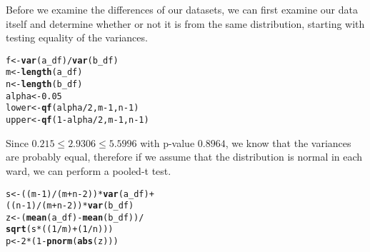 \documentclass[10pt]{article}\usepackage[]{graphicx}\usepackage[]{xcolor}
\makeatletter
\newcommand{\hlnum}[1]{\textcolor[rgb]{0.686,0.059,0.569}{#1} }%
\newcommand{\hlopt}[1]{\textcolor[rgb]{0,0,0}{#1} }%
\newcommand{\hlstd}[1]{\textcolor[rgb]{0.345,0.345,0.345}{#1} }%
\newcommand{\hlkwb}[1]{\textcolor[rgb]{0.69,0.353,0.396}{#1} }%
\newcommand{\hlkwd}[1]{\textcolor[rgb]{0.737,0.353,0.396}{\textbf{#1} } }%
\newenvironment{kframe}{%
 \def\at@end@of@kframe{}%
 \ifinner\ifhmode%
  \def\at@end@of@kframe{\end{minipage} }%
  \begin{minipage}{\columnwidth}%
 \fi\fi%
 \def\FrameCommand##1{\hskip\@totalleftmargin \hskip-\fboxsep
 \colorbox{shadecolor}{##1}\hskip-\fboxsep
     \hskip-\linewidth \hskip-\@totalleftmargin \hskip\columnwidth}%
 \MakeFramed {\advance\hsize-\width
   \@totalleftmargin\z@ \linewidth\hsize
   \@setminipage} }%
 {\par\unskip\endMakeFramed%
 \at@end@of@kframe}
\newenvironment{knitrout}{}{} %
\makeatother
\begin{document}
\begin{easylist}[enumerate]
    Before we examine the differences of our datasets, we can first examine our data itself and determine whether or not
    it is from the same distribution, starting with testing equality of the variances.

\begin{knitrout}
\color{fgcolor}\begin{kframe}
\begin{alltt}
             \hlstd{f} \hlkwb{<-} \hlkwd{var}\hlstd{(a_df)} \hlopt{/} \hlkwd{var}\hlstd{(b_df)}
             \hlstd{m} \hlkwb{<-} \hlkwd{length}\hlstd{(a_df)}
             \hlstd{n} \hlkwb{<-} \hlkwd{length}\hlstd{(b_df)}
             \hlstd{alpha} \hlkwb{<-} \hlnum{0.05}
             \hlstd{lower} \hlkwb{<-} \hlkwd{qf}\hlstd{(alpha} \hlopt{/} \hlnum{2}\hlstd{, m} \hlopt{-} \hlnum{1}\hlstd{, n} \hlopt{-} \hlnum{1}\hlstd{)}
             \hlstd{upper} \hlkwb{<-} \hlkwd{qf}\hlstd{(}\hlnum{1} \hlopt{-} \hlstd{alpha} \hlopt{/} \hlnum{2}\hlstd{, m} \hlopt{-} \hlnum{1}\hlstd{, n} \hlopt{-} \hlnum{1}\hlstd{)}
\end{alltt}
\end{kframe}
\end{knitrout}


    Since $0.215 \le 2.9306 \le 5.5996$ with p-value $0.8964$, we know that the variances
    are probably equal, therefore if we assume that the distribution is normal in each ward, we can perform a pooled-t
    test.

\begin{knitrout}
\color{fgcolor}\begin{kframe}
\begin{alltt}
             \hlstd{s} \hlkwb{<-} \hlstd{((m} \hlopt{-} \hlnum{1}\hlstd{)}\hlopt{/}\hlstd{(m} \hlopt{+} \hlstd{n} \hlopt{-} \hlnum{2}\hlstd{))} \hlopt{*} \hlkwd{var}\hlstd{(a_df)} \hlopt{+}
                     \hlstd{((n} \hlopt{-} \hlnum{1}\hlstd{)}\hlopt{/}\hlstd{(m} \hlopt{+} \hlstd{n} \hlopt{-} \hlnum{2}\hlstd{))} \hlopt{*} \hlkwd{var}\hlstd{(b_df)}
             \hlstd{z} \hlkwb{<-} \hlstd{(}\hlkwd{mean}\hlstd{(a_df)} \hlopt{-} \hlkwd{mean}\hlstd{(b_df))} \hlopt{/}
                     \hlkwd{sqrt}\hlstd{(s} \hlopt{*} \hlstd{((}\hlnum{1}\hlopt{/}\hlstd{m)} \hlopt{+} \hlstd{(}\hlnum{1}\hlopt{/}\hlstd{n)))}
             \hlstd{p} \hlkwb{<-} \hlnum{2} \hlopt{*} \hlstd{(}\hlnum{1} \hlopt{-} \hlkwd{pnorm}\hlstd{(}\hlkwd{abs}\hlstd{(z)))}
\end{alltt}
\end{kframe}
\end{knitrout}



\end{easylist}
\end{document}
